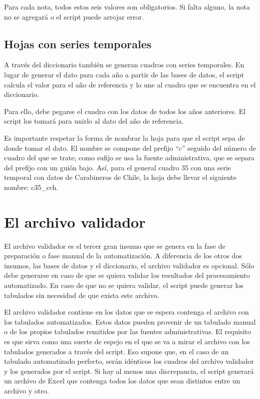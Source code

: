 \documentclass[
  spanish,
]{book}
\begin{document}
Para cada nota, todos estos seis valores son obligatorios. Si falta alguno, la nota no se agregará o el script puede arrojar error.

\hypertarget{hojas-con-series-temporales}{%
\section{Hojas con series temporales}\label{hojas-con-series-temporales}}

A través del diccionario también se generan cuadros con series temporales. En lugar de generar el dato para cada año a partir de las bases de datos, el script calcula el valor para el año de referencia y lo une al cuadro que se encuentra en el diccionario.

Para ello, debe pegarse el cuadro con los datos de todos los años anteriores. El script los tomará para unirlo al dato del año de referencia.

Es importante respetar la forma de nombrar la hoja para que el script sepa de donde tomar el dato. El nombre se compone del prefijo ``c'' seguido del número de cuadro del que se trate; como sufijo se usa la fuente administrativa, que se separa del prefijo con un guión bajo. Así, para el general cuadro 35 con una serie temporal con datos de Carabineros de Chile, la hoja debe llevar el siguiente nombre: c35\_cch.

\hypertarget{el-archivo-validador}{%
\chapter{El archivo validador}\label{el-archivo-validador}}

El archivo validador es el tercer gran insumo que se genera en la fase de preparación o fase manual de la automatización. A diferencia de los otros dos insumos, las bases de datos y el diccionario, el archivo validador es opcional. Sólo debe generarse en caso de que se quiera validar los resultados del procesamiento automatizado. En caso de que no se quiera validar, el script puede generar los tabulados sin necesidad de que exista este archivo.

El archivo validador contiene en los datos que se espera contenga el archivo con los tabulados automatizados. Estos datos pueden provenir de un tabulado manual o de los propios tabulados remitidos por las fuentes administrativas. El requisito es que sirva como una suerte de espejo en el que se va a mirar el archivo con los tabulados generados a través del script. Eso supone que, en el caso de un tabulado automatizado perfecto, serán idénticos los cuadros del archivo validador y los generados por el script. Si hay al menos una discrepancia, el script generará un archivo de Excel que contenga todos los datos que sean distintos entre un archivo y otro.
\end{document}

